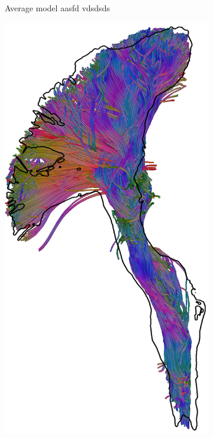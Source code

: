 \begin{figure}[t]
\begin{minipage}{0.19\linewidth}
\begin{subfigure}[b]{\linewidth}
		\caption{Average model {\color{white} aasfd vdsdsds}}
	\end{subfigure}
	\begin{subfigure}[b]{\linewidth}
		\includegraphics[width=\linewidth]{cst-avg-bootstrap-c}

\end{subfigure}
\end{minipage}
\end{figure}
